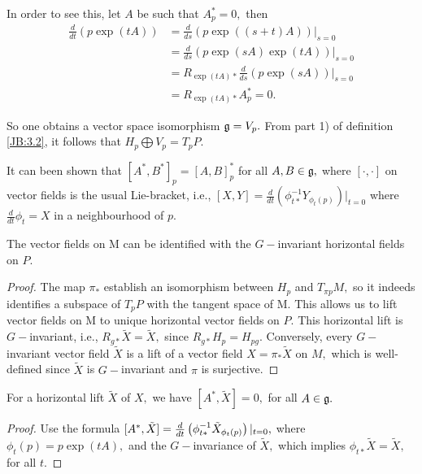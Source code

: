 In order to see this, let $A$ be such that $A^{*}_{p}=0,$ then 
\begin{align*}
 \frac{d}{dt}(p \exp(tA))&= \frac{d}{ds}(p \exp((s+t)A))|_{s=0} \\
&= \frac{d}{ds}(p\exp(sA)\exp(tA))|_{s=0} \\
&= R_{\exp(tA)*}\frac{d}{ds}(p \exp(sA))|_{s=0} \\
&= R_{\exp(tA)*} A^{*}_{p}=0.
\end{align*}

So one obtains a vector space isomorphism $\mathfrak{g}=V_{p}.$ From part 1) of definition \ref{JB:3.2}, it follows that
$H_{p} \bigoplus V_{p}=T_{p}P.$

It can been shown that $[A^{*},B^{*}]_{p}=[A,B]^{*}_{p}$ for all $A,B \in \mathfrak{g},$ where $[\cdot, \cdot]$ on vector
fields is the usual Lie-bracket, i.e., $[X,Y]=\frac{d}{dt}(\phi^{-1}_{t*}Y_{\phi_{t}(p)})|_{t=0}$ where
$\frac{d}{dt}\phi_{t}=X$ in a neighbourhood of $p.$

\begin{prop}
\label{JB:3.4}
The vector fields on M can be identified with the $G-$invariant horizontal fields on $P.$ 
\end{prop}
\begin{proof}
 The map $\pi_{*}$ establish an isomorphism between $H_{p}$ and $T_{\pi{p}}M,$ so it indeeds identifies a subspace of
$T_{p}P$ with the tangent space of M. This allows us to lift vector fields on M to unique horizontal vector fields on
$P.$ This horizontal lift is $G-$invariant, i.e., $R_{g*}\tilde{X}=\tilde{X},$ since $R_{g*}H_{p}=H_{pg}.$ Conversely,
every $G-$invariant vector field $\tilde{X}$ is a lift of a vector field $X=\pi_{*}\tilde{X}$ on $M,$ which is
well-defined since $\tilde{X}$ is $G-$invariant and $\pi$ is surjective. 
\end{proof}

\begin{lem}
 For a horizontal lift $\tilde{X}$ of $X,$ we have $[A^{*}, \tilde{X}]=0,$ for all $A \in \mathfrak{g}.$
\end{lem}

\begin{proof}
 Use the formula $[A^{*}, \tilde{X}]= \frac{d}{dt}\left( \phi^{-1}_{t*}\tilde{X}_{\phi_{t}(p)} \right)|_{t=0},$ where
$\phi_{t}(p)= p \exp (tA),$ and the $G-$invariance of $\tilde{X},$ which implies $\phi_{t*}\tilde{X}=\tilde{X},$ for
all $t$.
\end{proof}

